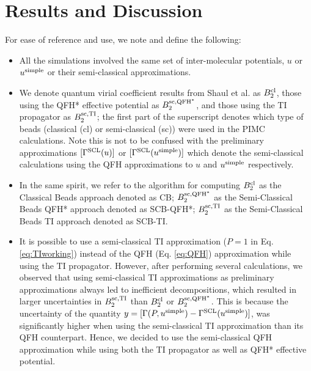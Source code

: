\section{Results and Discussion}
    For ease of reference and use, we note and define the following:
    \begin{itemize}
        \item All the simulations involved the same set of inter-molecular potentials, $u$ or $u^{\rm simple}$ or their semi-classical approximations.
        \item We denote quantum virial coefficient results from Shaul et al. \cite{Shaul2012} as $B_2^{\rm cl}$, those using the QFH* effective potential as $B_2^{\rm sc,QFH^*}$, and those using the TI propagator as $B_2^{\rm sc,TI}$; the first part of the superscript denotes which type of beads (classical (cl) or semi-classical (sc)) were used in the PIMC calculations. Note this is not to be confused with the preliminary approximations $[\Gamma^{\rm SCL} (u)]$ or $[\Gamma^{\rm SCL} (u^{\rm simple})]$ which denote the semi-classical calculations using the QFH approximations to $u$ and $u^{\rm simple}$ respectively.
        \item In the same spirit, we refer to the algorithm for computing $B_2^{\rm cl}$ as the Classical Beads approach denoted as CB; $B_2^{\rm sc,QFH^*}$ as the Semi-Classical Beads QFH* approach denoted as SCB-QFH*; $B_2^{\rm sc,TI}$ as the Semi-Classical Beads TI approach denoted as SCB-TI.
        \item It is possible to use a semi-classical TI approximation ($P = 1$ in Eq. \eqref{eq:TIworking}) instead of the QFH (Eq. \eqref{eq:QFH}) approximation while using the TI propagator. However, after performing several calculations, we observed that using semi-classical TI approximations as preliminary approximations always led to inefficient decompositions, which resulted in larger uncertainties in $B_2^{\rm sc,TI}$ than $B_2^{\rm cl}$ or $B_2^{\rm sc,QFH^*}$. This is because the uncertainty of the quantity $y = [\Gamma (P, u^{\rm simple}) - \Gamma^{\rm SCL} (u^{\rm simple})]$, was significantly higher when using the semi-classical TI approximation than its QFH counterpart. Hence, we decided to use the semi-classical QFH approximation while using both the TI propagator as well as QFH* effective potential.
    \end{itemize}

